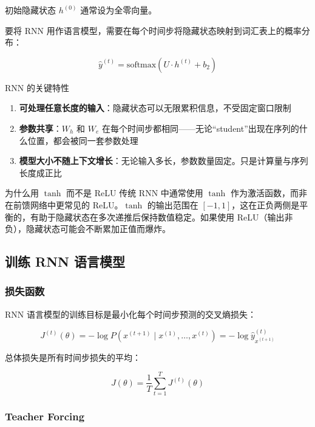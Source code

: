 \documentclass[a4paper]{article}
\begin{document}
初始隐藏状态 $h^{(0)}$ 通常设为全零向量。





要将 RNN 用作语言模型，需要在每个时间步将隐藏状态映射到词汇表上的概率分布：

$$\hat{y}^{(t)} = \text{softmax}(U \cdot h^{(t)} + b_2)$$

\begin{importantbox}{RNN 的关键特性}
\begin{enumerate}
    \item \textbf{可处理任意长度的输入}：隐藏状态可以无限累积信息，不受固定窗口限制
    \item \textbf{参数共享}：$W_h$ 和 $W_e$ 在每个时间步都相同——无论``student''出现在序列的什么位置，都会被同一套参数处理
    \item \textbf{模型大小不随上下文增长}：无论输入多长，参数数量固定。只是计算量与序列长度成正比
\end{enumerate}
\end{importantbox}

\begin{knowledgebox}{为什么用 $\tanh$ 而不是 ReLU}
传统 RNN 中通常使用 $\tanh$ 作为激活函数，而非在前馈网络中更常见的 ReLU。$\tanh$ 的输出范围在 $[-1, 1]$，这在正负两侧是平衡的，有助于隐藏状态在多次递推后保持数值稳定。如果使用 ReLU（输出非负），隐藏状态可能会不断累加正值而爆炸。
\end{knowledgebox}

\subsection{训练 RNN 语言模型}

\subsubsection{损失函数}

RNN 语言模型的训练目标是最小化每个时间步预测的交叉熵损失：

$$J^{(t)}(\theta) = -\log P(x^{(t+1)} \mid x^{(1)}, \ldots, x^{(t)}) = -\log \hat{y}^{(t)}_{x^{(t+1)}}$$

总体损失是所有时间步损失的平均：

$$J(\theta) = \frac{1}{T} \sum_{t=1}^{T} J^{(t)}(\theta)$$





\subsubsection{Teacher Forcing}
\end{document}

